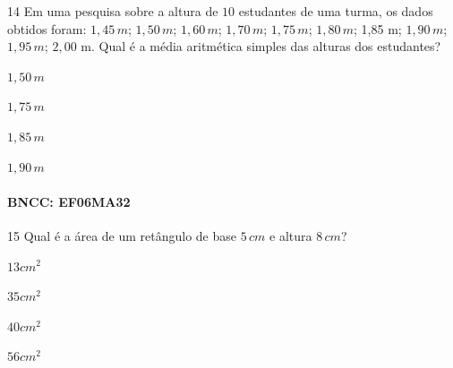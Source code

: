 {\num{14} Em uma pesquisa sobre a altura de $10$ estudantes de uma turma, os
dados obtidos foram: $1,45\,m$; $1,50\,m$; $1,60\,m$; $1,70\,m$; $1,75\,m$; $1,80\,m$;
1,85 m; $1,90\,m$; $1,95\,m$; $2,00$ m. Qual é a média aritmética simples das
alturas dos estudantes?

\begin{escolha}
\item $1,50\,m$
\item $1,75\,m$
\item $1,85\,m$
\item $1,90\,m$
\end{escolha}

\paragraph{BNCC: EF06MA32 }


\num{15} Qual é a área de um retângulo de base $5\,cm$ e altura $8\,cm$?

\begin{escolha}
\item
  $13cm^2$
\item
  $35cm^2$
\item
  $40cm^2$
\item
  $56cm^2$
\end{escolha}

}
